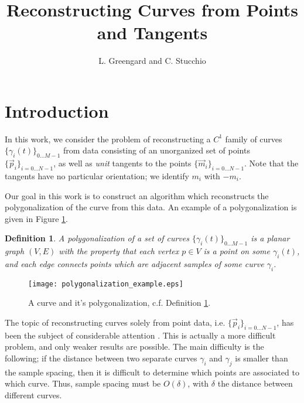 \documentclass{article}
\newtheorem{definition}[cntr]{Definition}
\numberwithin{cntr}{section}
\numberwithin{equation}{section}
\newcommand{\vp}[0]{{\vec{p}}}
\newcommand{\vm}[0]{{\vec{m}}}
\newcommand{\Oto}[1]{{0 \ldots #1-1}}
\newcommand{\OtoN}{{0 \ldots N-1}}
\newcommand{\pointData}{{ \{ \vp_{i} \}_{i=\OtoN} }}
\newcommand{\tanData}{{ \{ \vm_{i} \}_{i=\OtoN} }}
\newcommand{\curveSet}{{ \{ \gamma_i(t) \}_{\Oto{M}}}}
\newcommand{\curvesep}{{\delta}}
\begin{document}
\title{Reconstructing Curves from Points and Tangents}

\author{L. Greengard and C. Stucchio}

\maketitle

\section{Introduction}

In this work, we consider the problem of reconstructing a $C^{1}$ family of curves $\curveSet$ from data consisting of an unorganized set of points $\pointData$, as well as \emph{unit} tangents to the points $\tanData$. Note that the tangents have no particular orientation; we identify $m_{i}$ with $-m_{i}$.

Our goal in this work is to construct an algorithm which reconstructs the polygonalization of the curve from this data. An example of a polygonalization is given in Figure \ref{fig:polygonalization}.

\begin{definition}
  \label{def:polygonalization}
  A polygonalization of a set of curves $\curveSet$ is a planar graph $(V,E)$ with the property that each vertex $p \in V$ is a point on some $\gamma_{i}(t)$, and each edge connects points which are adjacent samples of some curve $\gamma_{i}$.
\end{definition}

\begin{figure}
\setlength{\unitlength}{0.240900pt}
\ifx\plotpoint\undefined\newsavebox{\plotpoint}\fi
\sbox{\plotpoint}{\rule[-0.200pt]{0.400pt}{0.400pt}}%
\texttt{[image: polygonalization\_example.eps]}

\caption{A curve and it's polygonalization, c.f. Definition \ref{def:polygonalization}. }
\label{fig:polygonalization}
\end{figure}

The topic of reconstructing curves solely from point data, i.e. $\pointData$, has been the subject of considerable attention \cite{amenta98crust,amenta98new,dey99curve,hoppe92surface,amenta02simple, dey01reconstructing}. This is actually a more difficult problem, and only weaker results are possible. The main difficulty is the following; if the distance between two separate curves $\gamma_{i}$ and $\gamma_{j}$ is smaller than the sample spacing, then it is difficult to determine which points are associated to which curve. Thus, sample spacing must be $O(\curvesep)$, with $\curvesep$ the distance between different curves.
\end{document}
